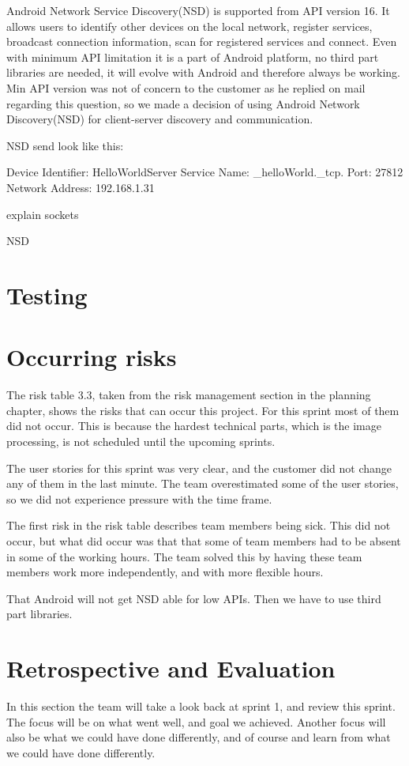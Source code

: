 Android Network Service Discovery(NSD) is supported from API version 16. 
It allows users to identify other devices on the local network, register services, broadcast connection information, scan for registered services and connect.
Even with minimum API limitation it is a part of Android platform, no third part libraries are needed, it will evolve with Android and therefore always be working.
Min API version was not of concern to the customer as he replied on mail regarding this question, so we made a decision of using Android Network Discovery(NSD) for client-server discovery and communication.

NSD send look like this:

Device Identifier: HelloWorldServer
Service Name: \_helloWorld.\_tcp.
Port: 27812
Network Address: 192.168.1.31

explain sockets

NSD
\section{Testing}

\section{Occurring risks}
The risk table 3.3, taken from the risk management section in the planning chapter, shows the risks that can occur this project. 
For this sprint most of them did not occur. 
This is because the hardest technical parts, which is the image processing, is not scheduled until the upcoming sprints. 

The user stories for this sprint was very clear, and the customer did not change any of them in the last minute. The team overestimated some of the user stories, so we did not experience pressure with the time frame. 

The first risk in the risk table describes team members being sick. This did not occur, but what did occur was that that some of team members had to be absent in some of the working hours. 
The team solved this by having these team members work more independently, and with more flexible hours.  

That Android will not get NSD able for low APIs. 
Then we have to use third part libraries.

\section{Retrospective and Evaluation}
In this section the team will take a look back at sprint 1, and review this sprint. The focus will be on what went well, and goal we achieved. Another focus will also be what we could have done differently, and of course and learn from what we could have done differently.

